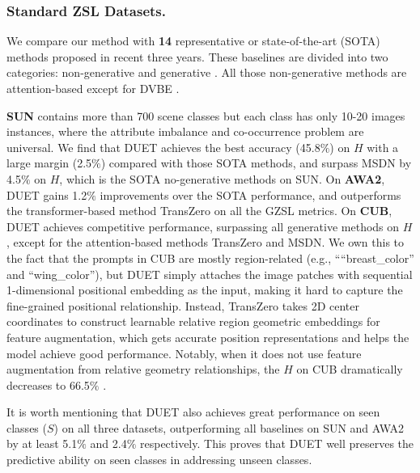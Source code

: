 \documentclass[letterpaper]{article} \usepackage{aaai23}  \usepackage{times}  \usepackage{helvet}  \usepackage{courier}  \usepackage[hyphens]{url}  \usepackage{graphicx} \urlstyle{rm} \def\UrlFont{\rm}  \usepackage{natbib}  \usepackage{caption} \frenchspacing  \setlength{\pdfpagewidth}{8.5in}  \setlength{\pdfpageheight}{11in}  \usepackage{algorithm}
\newcommand{\fy}[1]{{\color{black}#1}}
\newcommand{\gyx}[1]{{\color{black}#1}}
\begin{document}
\subsubsection{\textbf{Standard ZSL Datasets.}}
We compare our method with \textbf{14} representative {or state-of-the-art (SOTA) methods proposed in recent three years.}
{These baselines are divided into two \gyx{categories}:}
non-generative \cite{DBLP:conf/nips/XuXWSA20,DBLP:conf/cvpr/MinYXWZZ20,DBLP:conf/cvpr/HuynhE20,DBLP:conf/eccv/Xie0ZZZYQ020,DBLP:conf/cvpr/Liu00H00H21,Chen2022MSDN,Chen2021TransZero} and generative \cite{DBLP:conf/eccv/NarayanGKSS20,DBLP:conf/nips/HuynhE20,DBLP:conf/cvpr/HanF0021,DBLP:conf/cvpr/YueWS0Z21,DBLP:conf/iccv/0002WXPYZ021,Chen2021HSVA,DBLP:conf/iclr/ChouLL21}.
All those non-generative methods are attention-based except {for} DVBE \cite{DBLP:conf/cvpr/MinYXWZZ20}.

\textbf{SUN} contains more than 700 scene classes but each class has {only 10-20 images instances, where the attribute} imbalance and co-occurrence problem are universal.
We find that DUET achieves the best accuracy (45.8$\%$) \fy{on} $H$ with a large margin (2.5$\%$) compared with those SOTA methods, and surpass MSDN by 4.5$\%$ on $H$, which is the SOTA no-generative methods on SUN.
{On \textbf{AWA2}, DUET gains 1.2$\%$ improvements over the SOTA performance}, and outperforms the transformer-based method TransZero  \fy{on} all {the} GZSL metrics.
{On \textbf{CUB},} DUET achieves competitive performance\fy{, surpassing all generative methods on $H$, {except for the attention-based methods} TransZero and MSDN.}
We own this to the fact that the prompts in CUB are mostly region-related (e.g., ````breast\_color'' and ``wing\_color''),  but DUET simply 
{attaches} the image patches with sequential 1-dimensional positional embedding as the input, {making it hard to capture} the fine-grained positional relationship.
Instead, TransZero {takes}
2D  center coordinates to construct learnable relative region \fy{geometric} embeddings for feature augmentation, which gets accurate position representations and {helps
the model achieve good performance}.  
{Notably, when it does not use} feature augmentation from relative geometry relationships, the $H$ on CUB dramatically decreases to 66.5$\%$ \cite{Chen2021TransZero}.

{It is worth mentioning that DUET also achieves great performance on  seen classes ($S$) on all three datasets, \fy{outperforming} all baselines on SUN and AWA2 by at least 5.1$\%$ and 2.4$\%$ respectively.
This \fy{proves} that DUET well preserves the predictive ability {on} seen class\fy{es} in addressing unseen classes.}
\end{document}
